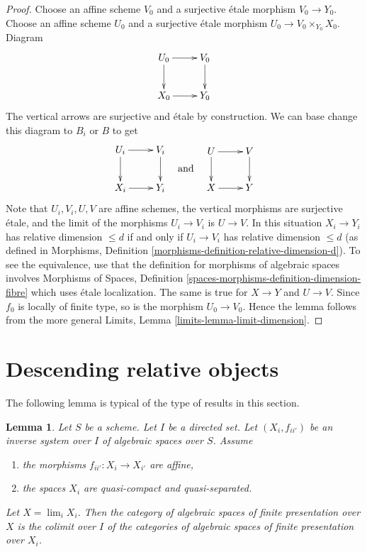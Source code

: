 \documentclass{stacks-project}
\theoremstyle{plain}
\newtheorem{lemma}[subsection]{Lemma}
\theoremstyle{definition}
\theoremstyle{remark}
\numberwithin{equation}{subsection}
\def\lim{\mathop{\mathrm{lim}}\nolimits}
\begin{document}
\begin{proof}
Choose an affine scheme $V_0$ and a surjective \'etale morphism
$V_0 \to Y_0$. Choose an affine scheme $U_0$ and a surjective \'etale
morphism $U_0 \to V_0 \times_{Y_0} X_0$. Diagram
$$
\xymatrix{
U_0 \ar[d] \ar[r] & V_0 \ar[d] \\
X_0 \ar[r] & Y_0
}
$$
The vertical arrows are surjective and \'etale by construction.
We can base change this diagram to $B_i$ or $B$ to get
$$
\vcenter{
\xymatrix{
U_i \ar[d] \ar[r] & V_i \ar[d] \\
X_i \ar[r] & Y_i
}
}
\quad\text{and}\quad
\vcenter{
\xymatrix{
U \ar[d] \ar[r] & V \ar[d] \\
X \ar[r] & Y
}
}
$$
Note that $U_i, V_i, U, V$ are affine schemes,
the vertical morphisms are surjective \'etale, and the limit of the
morphisms $U_i \to V_i$ is $U \to V$.
In this situation $X_i \to Y_i$ has relative dimension $\leq d$
if and only if $U_i \to V_i$ has relative dimension $\leq d$
(as defined in Morphisms, Definition
\ref{morphisms-definition-relative-dimension-d}).
To see the equivalence, use that the definition for morphisms
of algebraic spaces involves Morphisms of Spaces, Definition
\ref{spaces-morphisms-definition-dimension-fibre}
which uses \'etale localization. The same is true for $X \to Y$ and $U \to V$.
Since $f_0$ is locally of finite type, so is the morphism $U_0 \to V_0$.
Hence the lemma follows from the more general
Limits, Lemma \ref{limits-lemma-limit-dimension}.
\end{proof}














\section{Descending relative objects}
\label{section-descending-relative}

\noindent
The following lemma is typical of the type of results in this section.

\begin{lemma}
\label{lemma-descend-finite-presentation}
Let $S$ be a scheme. Let $I$ be a directed set.
Let $(X_i, f_{ii'})$ be an inverse system over $I$ of algebraic spaces
over $S$. Assume
\begin{enumerate}
\item the morphisms $f_{ii'} : X_i \to X_{i'}$ are affine,
\item the spaces $X_i$ are quasi-compact and quasi-separated.
\end{enumerate}
Let $X = \lim_i X_i$. Then the category of algebraic spaces
of finite presentation over $X$ is the colimit over $I$ of the
categories of algebraic spaces of finite presentation over $X_i$.
\end{lemma}
\end{document}
